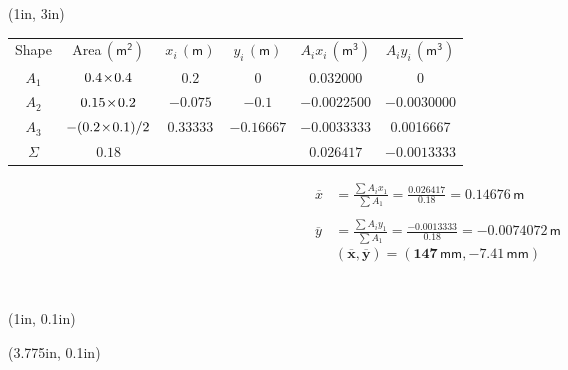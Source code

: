 \documentclass[10pt,oneside]{article}
\def\scale{1}
\begin{document}
\begin{textblock*}{6.75in}(1in, 3in)
	\centering
	
	\Large\parb\vspace{1cm}\centering
	\begin{tabular}{cccccc}
			Shape            & Area$\,\mathsf{\left(m^2 \right)}$                         & $x_i\,\mathsf{\left(m \right)}$               & $y_i\,\mathsf{\left(m \right)}$               & $A_ix_i\,\mathsf{\left(m^3 \right)}$                        & $A_iy_i\,\mathsf{\left(m^3 \right)}$                        \\
			\addlinespace
			\midrule
			$A_1$            & $0.4\!\times\! 0.4$                      & $0.2$            & $0$            & \textcolor{saitRed}{$0.032000$}   & \textcolor{saitRed}{$0$}   \\
			\midrule
			$A_2$            & $0.15\!\times\!0.2$                      & $-0.075$            & $-0.1$            & \textcolor{saitRed}{$-0.0022500$}   & \textcolor{saitRed}{$-0.0030000$}   \\
			\midrule
			$A_3$            & $-(0.2\!\times\!0.1)/2$                     & $0.33333$            & $-0.16667$           & \textcolor{saitRed}{$-0.0033333$}   & \textcolor{saitRed}{0.0016667}    \\
			
			\bottomrule\addlinespace
			{\Large$\Sigma$} & \textcolor{saitRed}{$0.18$} &                     &                     & \textcolor{saitRed}{$0.026417$}   & \textcolor{saitRed}{$-0.0013333$}
		\end{tabular}
		\parb
		\begin{align*}
			\overline{x} &= \frac{\sum A_ix_1}{\sum A_1}=\frac{0.026417}{0.18} = 0.14676\,\mathsf{m}\\\\
			\overline{y} &= \frac{\sum A_iy_1}{\sum A_1}=\frac{-0.0013333}{0.18} = -0.0074072\,\mathsf{m}
		\end{align*}
		\parb
		$$ \bm{(\overline{x}, \overline{y}) = (147\,\mathsf{mm}, -7.41\,\mathsf{mm})} $$
\end{textblock*}

~\newpage
% 

\begin{textblock*}{2.25in}(1in, 0.1in)
\end{textblock*}
\begin{textblock*}{4.125in}(3.775in, 0.1in)
	\cbox{
	\centering
	\def\scale{1}
	
	}
\end{textblock*}
\end{document}
